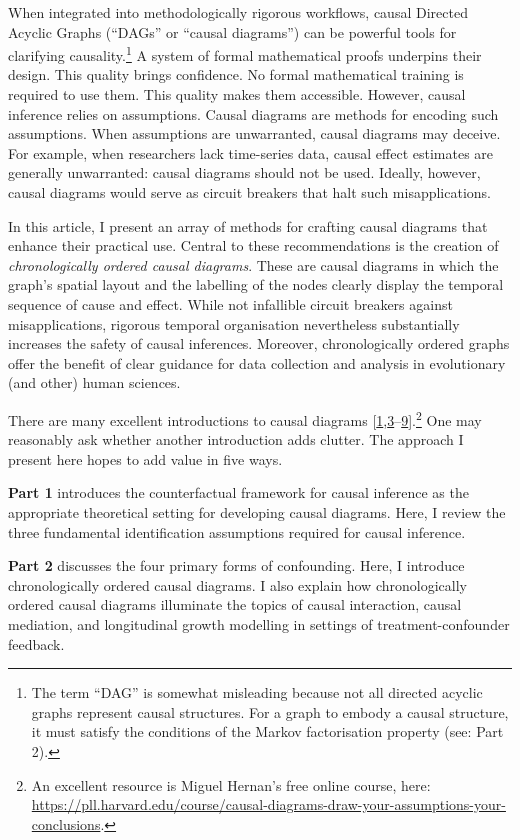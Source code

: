 \documentclass[
  singlecolumn]{article}
\begin{document}
When integrated into methodologically rigorous workflows, causal
Directed Acyclic Graphs (``DAGs'' or ``causal diagrams'') can be
powerful tools for clarifying causality.\footnote{The term ``DAG'' is
  somewhat misleading because not all directed acyclic graphs represent
  causal structures. For a graph to embody a causal structure, it must
  satisfy the conditions of the Markov factorisation property (see: Part
  2).} A system of formal mathematical proofs underpins their design.
This quality brings confidence. No formal mathematical training is
required to use them. This quality makes them accessible. However,
causal inference relies on assumptions. Causal diagrams are methods for
encoding such assumptions. When assumptions are unwarranted, causal
diagrams may deceive. For example, when researchers lack time-series
data, causal effect estimates are generally unwarranted: causal diagrams
should not be used. Ideally, however, causal diagrams would serve as
circuit breakers that halt such misapplications.

In this article, I present an array of methods for crafting causal
diagrams that enhance their practical use. Central to these
recommendations is the creation of \emph{chronologically ordered causal
diagrams}. These are causal diagrams in which the graph's spatial layout
and the labelling of the nodes clearly display the temporal sequence of
cause and effect. While not infallible circuit breakers against
misapplications, rigorous temporal organisation nevertheless
substantially increases the safety of causal inferences. Moreover,
chronologically ordered graphs offer the benefit of clear guidance for
data collection and analysis in evolutionary (and other) human sciences.

There are many excellent introductions to causal diagrams
{[}\protect\hyperlink{ref-mcelreath2020}{1},\protect\hyperlink{ref-rohrer2018}{3}--\protect\hyperlink{ref-pearl2009}{9}{]}.\footnote{An
  excellent resource is Miguel Hernan's free online course, here:
  \url{https://pll.harvard.edu/course/causal-diagrams-draw-your-assumptions-your-conclusions}.}
One may reasonably ask whether another introduction adds clutter. The
approach I present here hopes to add value in five ways.

\textbf{Part 1} introduces the counterfactual framework for causal
inference as the appropriate theoretical setting for developing causal
diagrams. Here, I review the three fundamental identification
assumptions required for causal inference.

\textbf{Part 2} discusses the four primary forms of confounding. Here, I
introduce chronologically ordered causal diagrams. I also explain how
chronologically ordered causal diagrams illuminate the topics of causal
interaction, causal mediation, and longitudinal growth modelling in
settings of treatment-confounder feedback.
\end{document}
